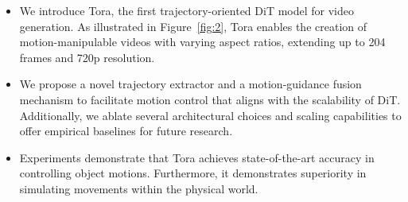 \begin{itemize}
\item %
We introduce Tora, the first trajectory-oriented DiT model for video generation. As illustrated in Figure~\ref{fig:2}, Tora enables the creation of motion-manipulable videos with varying aspect ratios, extending up to 204 frames and 720p resolution.

\item %
We propose a novel trajectory extractor and a motion-guidance fusion mechanism to facilitate motion control that aligns with the scalability of DiT. Additionally, we ablate several architectural choices and scaling capabilities to offer empirical baselines for future research.

\item %
Experiments demonstrate that Tora achieves state-of-the-art accuracy in controlling object motions. Furthermore, it demonstrates superiority in simulating movements within the physical world.
\end{itemize}
